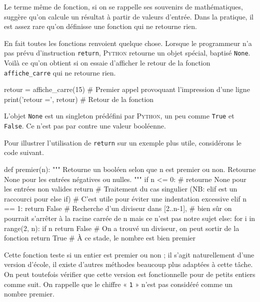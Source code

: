 Le terme même de fonction, si on se rappelle ses souvenirs de mathématiques, suggère qu'on calcule un résultat à partir de valeurs d'entrée. Dans la pratique, il est assez rare qu'on définisse une fonction qui ne retourne rien.

En fait toutes les fonctions renvoient quelque chose. Lorsque le programmeur n'a pas prévu d'instruction \texttt{return}, \textsc{Python} retourne un objet spécial, baptisé \texttt{None}. Voilà ce qu'on obtient si on essaie d'afficher le retour de la fonction \texttt{affiche\_carre} qui ne retourne rien.

\begin{idleconsole*}
\begin{pyconsole}
retour = affiche_carre(15) # Premier appel provoquant l'impression d'une ligne
print('retour =', retour)  # Retour de la fonction
\end{pyconsole}
\end{idleconsole*}

L'objet \texttt{None} est un singleton prédéfini par \textsc{Python}, un peu comme \texttt{True} et \texttt{False}. Ce n'est pas par contre une valeur booléenne.

Pour illustrer l'utilisation de \texttt{return} sur un exemple plus utile, considérons le code suivant.

\begin{idleconsole*}
\begin{pyconsole}
def premier(n):
    """
    Retourne un booléen selon que n est premier ou non.
    Retourne None pour les entrées négatives ou nulles.
    """
    if n <= 0: # retourne None pour les entrées non valides
        return
    # Traitement du cas singulier (NB: elif est un raccourci pour else if)
    # C'est utile pour éviter une indentation excessive
    elif n == 1:
        return False
    # Recherche d'un diviseur dans [2..n-1],
    # bien sûr on pourrait s'arrêter à la racine carrée de n mais ce n'est pas notre sujet
    else:
        for i in range(2, n):
            if n %
                return False # On a trouvé un diviseur, on peut sortir de la fonction
    return True # À ce stade, le nombre est bien premier

\end{pyconsole}
\end{idleconsole*}

Cette fonction teste si un entier est premier ou non ; il s'agit naturellement d'une version d'école, il existe d'autres méthodes beaucoup plus adaptées à cette tâche. On peut toutefois vérifier que cette version est fonctionnelle pour de petits entiers comme suit. On rappelle que le chiffre « \texttt{1} » n'est pas considéré comme un nombre premier.

